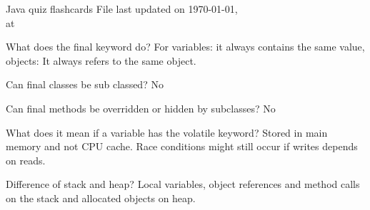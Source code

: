 


\usepackage{amssymb}
\usepackage{amsmath}
\usepackage{datetime}
\usepackage{listings}



\begin{flashcard}[Info]{Java quiz flashcards}
File last updated on \today, \\
at \currenttime

\end{flashcard}

\begin{flashcard}[Concurrency]{What does the final keyword do?}
For variables: it always contains the same value, objects: It always refers to the same object.
\end{flashcard}

\begin{flashcard}[Concurrency]{Can final classes be sub classed?}
No
\end{flashcard}

\begin{flashcard}[Concurrency]{Can final methods be overridden or hidden by subclasses?}
No
\end{flashcard}

\begin{flashcard}[Concurrency]{What does it mean if a variable has the volatile keyword?}
Stored in main memory and not CPU cache. Race conditions might still occur if writes depends on reads.
\end{flashcard}

\begin{flashcard}[Memory]{Difference of stack and heap?}
Local variables, object references and method calls on the stack and allocated objects on heap.
\end{flashcard}

